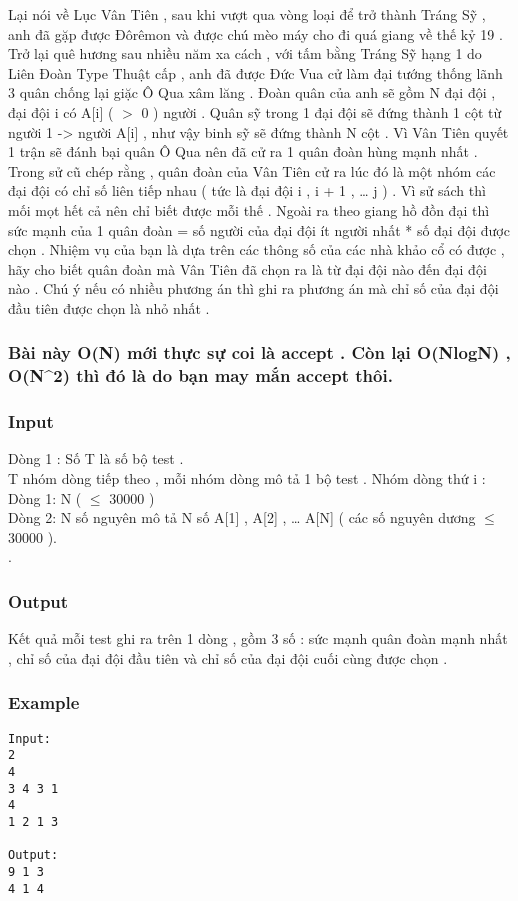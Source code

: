 



   Lại nói về Lục Vân Tiên , sau khi vượt qua vòng loại để trở thành Tráng Sỹ , anh đã gặp được Đôrêmon và được chú mèo máy cho đi quá giang về thế kỷ 19 . Trở lại quê hương sau nhiều năm xa cách , với tấm bằng Tráng Sỹ hạng 1 do Liên Đoàn Type Thuật cấp , anh đã được Đức Vua cử làm đại tướng thống lãnh 3 quân chống lại giặc Ô Qua xâm lăng . Đoàn quân của anh sẽ gồm N đại đội , đại đội i có A[i] ( $>$ 0 ) người . Quân sỹ trong 1 đại đội sẽ đứng thành 1 cột từ người 1 -> người A[i] , như vậy binh sỹ sẽ đứng thành N cột . Vì Vân Tiên quyết 1 trận sẽ đánh bại quân Ô Qua nên đã cử ra 1 quân đoàn hùng mạnh nhất . Trong sử cũ chép rằng , quân đoàn của Vân Tiên cử ra lúc đó là một nhóm các đại đội có chỉ số liên tiếp nhau ( tức là đại đội i , i + 1 , … j ) . Vì sử sách thì mối mọt hết cả nên chỉ biết được mỗi thế . Ngoài ra theo giang hồ đồn đại thì sức mạnh của 1 quân đoàn = số người của đại đội ít người nhất * số đại đội được chọn . Nhiệm vụ của bạn là dựa trên các thông số của các nhà khảo cổ có được , hãy cho biết quân đoàn mà Vân Tiên đã chọn ra là từ đại đội nào đến đại đội nào . Chú ý nếu có nhiều phương án thì ghi ra phương án mà chỉ số của đại đội đầu tiên được chọn là nhỏ nhất .  

\subsubsection{   Bài này O(N) mới thực sự coi là accept . Còn lại O(NlogN) , O(N^2) thì đó là do bạn may mắn accept thôi.  }

\subsubsection{   Input  }

   Dòng 1 : Số T là số bộ test .   
\\   T nhóm dòng tiếp theo , mỗi nhóm dòng mô tả 1 bộ test . Nhóm dòng thứ i :   
\\   Dòng 1: N (  $\le$  30000 )   
\\   Dòng 2: N số nguyên mô tả N số A[1] , A[2] , … A[N] ( các số nguyên dương  $\le$  30000 ).   
\\   .  

\subsubsection{   Output  }

   Kết quả mỗi test ghi ra trên 1 dòng , gồm 3 số : sức mạnh quân đoàn mạnh nhất , chỉ số của đại đội đầu tiên và chỉ số của đại đội cuối cùng được chọn .  

\subsubsection{   Example  }
\begin{verbatim}
Input:
2
4
3 4 3 1
4
1 2 1 3

Output:
9 1 3
4 1 4
\end{verbatim}
